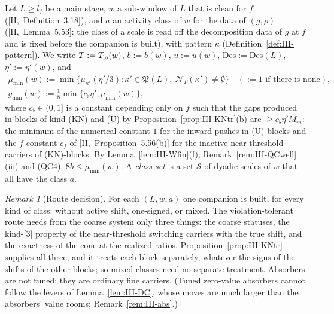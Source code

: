 \documentclass[10pt]{amsart}
\theoremstyle{definition}
\theoremstyle{remark}
\newtheorem{remark}[theorem]{Remark}
\begin{document}
Let $L\ge l_f$ be a main stage, $w$ a sub-window of $L$ that is clean for $f$
([II,~Definition~3.18]), and $a$ an activity class of $w$ for the data of
$(g,\rho)$ ([II,~Lemma~5.53]: the class of a scale is read off the
decomposition data of $g$ at $f$ and is fixed before the companion is built),
with pattern $\kappa$ (Definition~\ref{def:III-pattern}).  We write
$T:=T_{\rm lo}(w)$, $b:=b(w)$, $u:=u(w)$, $\mathrm{Des}:=\mathrm{Des}(L)$, $\eta':=
\eta'(w)$, and
\begin{gather*}
 \mu_{\min}(w):=\min\{\mu_{\kappa'}(\eta'/3):\kappa'\in\mathfrak P(L),\
 \mathcal N_T(\kappa')\ne\emptyset\}\quad(:=1\text{ if there is none}),\\
 g_{\min}(w):=\tfrac18\min\{c_\flat\eta',\mu_{\min}(w)\},
\end{gather*}
where $c_\flat\in(0,1]$ is a constant depending only on $f$ such that the
gaps produced in blocks of kind (KN) and (U) by
Proposition~\ref{prop:III-KNtr}(b) are $\ge c_\flat\eta'M_m$: the minimum of
the numerical constant $1$ for the inward pushes in (U)-blocks and the
$f$-constant $c_f$ of [II,~Proposition~5.56(b)] for the inactive
near-threshold carriers of (KN)-blocks.  By Lemma~\ref{lem:III-Wfin}(f), Remark~\ref{rem:III-QCwell}(iii)
and (QC4), $8b\le\mu_{\min}(w)$.  A \emph{class set} is a set $\mathcal S$ of
dyadic scales of $w$ that all have the class $a$.

\begin{remark}[Route decision]\label{rem:III-routedecision}
For each $(L,w,a)$ one companion is built, for every kind of class: without
active shift, one-signed, or mixed.  The violation-tolerant route needs from
the coarse system only three things: the coarse statuses, the kind-[3]
property of the near-threshold switching carriers with the true shift, and
the exactness of the cone at the realized ratios.  Proposition~\ref{prop:III-KNtr}
supplies all three, and it treats each block separately, whatever the signs
of the shifts of the other blocks; so mixed classes need no separate
treatment.  Absorbers are not tuned: they are ordinary fine carriers.
(Tuned zero-value absorbers cannot follow the levers of
Lemma~\ref{lem:III-DC}, whose moves are much larger than the absorbers'
value rooms; Remark~\ref{rem:III-abs}.)
\end{remark}
\end{document}

